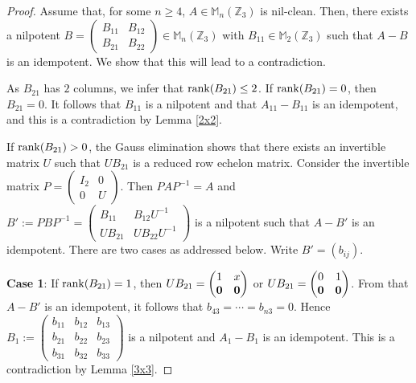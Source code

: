 \documentclass[12]{amsart}
\theoremstyle{definition}
\numberwithin{equation}{section}
\begin{document}
\begin{proof}
Assume that, for some $n\ge 4$, $A\in {\mathbb M}_n(\mathbb Z_3)$ is nil-clean.
Then, there exists a nilpotent $B=\begin{pmatrix}B_{11}&B_{12}\\
                       B_{21}&B_{22}\end{pmatrix}\in{\mathbb M}_n(\mathbb Z_3)$  with $B_{11}\in {\mathbb M}_2(\mathbb Z_3)$ such that
$A-B$ is an idempotent.	We show that this will lead to a contradiction.

As $B_{21}$ has $2$ columns, we infer that ${\rm rank}(B_{21})\le 2$.
If ${\rm rank}(B_{21})=0$, then $B_{21}=0$. It follows that $B_{11}$ is a nilpotent and that $A_{11}-B_{11}$ is an idempotent, and this is a contradiction by Lemma \ref{2x2}.

If ${\rm rank}(B_{21})>0$, the Gauss elimination shows that there exists an invertible matrix $U$ such that $UB_{21}$ is a reduced row echelon matrix.  Consider the invertible matrix $P=\begin{pmatrix}I_2&0\\
                       0&U\end{pmatrix}$. Then $PAP^{-1}=A$ and $B':=PBP^{-1}=\begin{pmatrix}B_{11}&B_{12}U^{-1}\\
                       UB_{21}&UB_{22}U^{-1}\end{pmatrix}$ is a nilpotent such that $A-B'$ is an idempotent. There are two cases as addressed below. Write $B'=(b_{ij})$.
											
{\bf Case 1}: If ${\rm rank}(B_{21})=1$, then
$UB_{21}=\begin{pmatrix}1&x\\
                       \bf 0&\bf 0\end{pmatrix}$ or $UB_{21}=\begin{pmatrix}0&1\\
                       \bf 0&\bf 0\end{pmatrix}$. From that  $A-B'$ is an idempotent, it follows that $b_{43}=\cdots=b_{n3}=0$. Hence
$B_1:=\begin{pmatrix}b_{11}&b_{12}&b_{13}\\
                       b_{21}&b_{22}&b_{23}\\
                       b_{31}&b_{32}&b_{33}\end{pmatrix}$ is a nilpotent and $A_1-B_1$ is an idempotent.	 This is a contradiction by Lemma \ref{3x3}.										


\end{proof}
\end{document}
